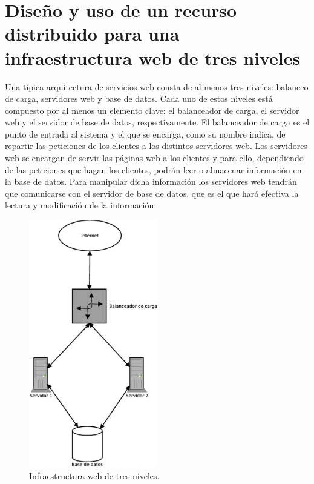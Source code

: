 \section{Diseño y uso de un recurso distribuido para una infraestructura web de tres niveles}

Una típica arquitectura de servicios web consta de al menos tres niveles: balanceo de carga, servidores web y base de datos. Cada uno de estos niveles está compuesto por al menos un elemento clave: el balanceador de carga, el servidor web y el servidor de base de datos, respectivamente. El balanceador de carga es el punto de entrada al sistema y el que se encarga, como su nombre indica, de repartir las peticiones de los clientes a los distintos servidores web. Los servidores web se encargan de servir las páginas web a los clientes y para ello, dependiendo de las peticiones que hagan los clientes, podrán leer o almacenar información en la base de datos. Para manipular dicha información los servidores web tendrán que comunicarse con el servidor de base de datos, que es el que hará efectiva la lectura y modificación de la información.\\

\begin{figure} [!htbp]
  \centering
  \includegraphics[width=0.5\textwidth]{figuras/Arquitectura_web2.eps}
  \caption{Infraestructura web de tres niveles.}
\label{figure:arquitectura-web}
\end{figure}

